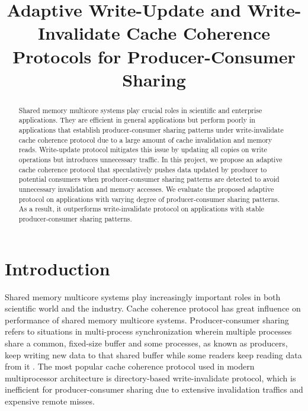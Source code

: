 \documentclass[11pt,conference]{IEEEtran}
\begin{document}
%
\title{Adaptive Write-Update and Write-Invalidate Cache Coherence Protocols for Producer-Consumer Sharing}


\author{
\and
{}
}

\maketitle


\begin{abstract}
Shared memory multicore systems play crucial roles in scientific and enterprise applications. They are efficient in general applications but perform poorly in applications that establish producer-consumer sharing patterns under write-invalidate cache coherence protocol due to a large amount of cache invalidation and memory reads. Write-update protocol mitigates this issue by updating all copies on write operations but introduces unnecessary traffic. In this project, we propose an adaptive cache coherence protocol that speculatively pushes data updated by producer to potential consumers when producer-consumer sharing patterns are detected to avoid unnecessary invalidation and memory accesses. We evaluate the proposed adaptive protocol on applications with varying degree of producer-consumer sharing patterns. As a result, it outperforms write-invalidate protocol on applications with stable producer-consumer sharing patterns.
\end{abstract}


\section{Introduction}
Shared memory multicore systems play increasingly important roles in both scientific world and the industry. Cache coherence protocol has great influence on performance of shared memory multicore systems. Producer-consumer sharing refers to situations in multi-process synchronization wherein multiple processes share a common, fixed-size buffer and some processes, as known as producers, keep writing new data to that shared buffer while some readers keep reading data from it \cite{wiki}. The most popular cache coherence protocol used in modern multiprocessor architecture is directory-based write-invalidate protocol, which is inefficient for producer-consumer sharing due to extensive invalidation traffics and expensive remote misses.
\end{document}
